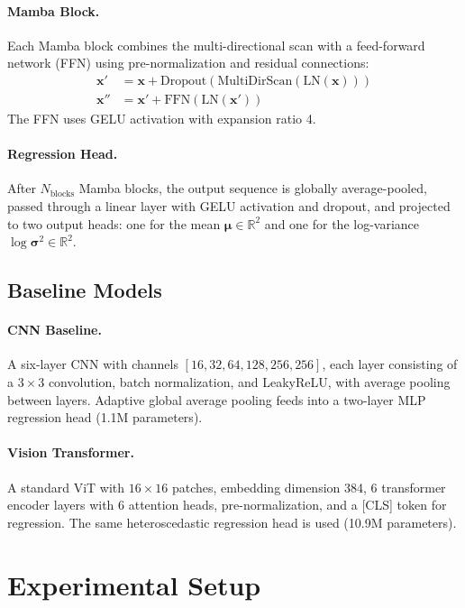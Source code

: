 \documentclass[twocolumn,showpacs,preprintnumbers,amsmath,amssymb,aps,prd]{revtex4-2}
\begin{document}
\paragraph{Mamba Block.}
Each Mamba block combines the multi-directional scan with a feed-forward network (FFN)
using pre-normalization and residual connections:
%
\begin{align}
    \mathbf{x}' &= \mathbf{x} + \text{Dropout}(\text{MultiDirScan}(\text{LN}(\mathbf{x}))) \\
    \mathbf{x}'' &= \mathbf{x}' + \text{FFN}(\text{LN}(\mathbf{x}'))
\end{align}
%
The FFN uses GELU activation with expansion ratio 4.

\paragraph{Regression Head.}
After $N_{\text{blocks}}$ Mamba blocks, the output sequence is globally average-pooled,
passed through a linear layer with GELU activation and dropout, and projected to two
output heads: one for the mean $\boldsymbol{\mu} \in \mathbb{R}^2$ and one for the
log-variance $\log \boldsymbol{\sigma}^2 \in \mathbb{R}^2$.

\subsection{Baseline Models}

\paragraph{CNN Baseline.}
A six-layer CNN with channels $[16, 32, 64, 128, 256, 256]$, each layer consisting of
a $3 \times 3$ convolution, batch normalization, and LeakyReLU, with average pooling
between layers. Adaptive global average pooling feeds into a two-layer MLP regression head
(1.1M parameters).

\paragraph{Vision Transformer.}
A standard ViT with $16 \times 16$ patches, embedding dimension 384, 6 transformer
encoder layers with 6 attention heads, pre-normalization, and a [CLS] token for
regression. The same heteroscedastic regression head is used (10.9M parameters).


\section{Experimental Setup}
\label{sec:experiments}
\end{document}
